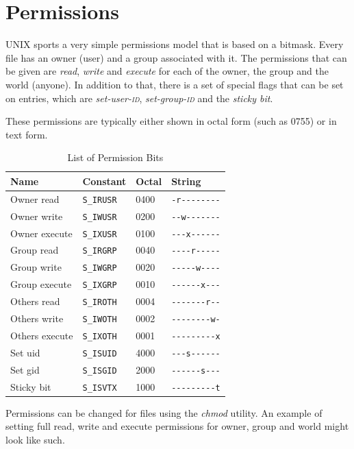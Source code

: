 \documentclass[a4paper]{article}
\begin{document}
\section{Permissions}\label{sec:permissions}

UNIX sports a very simple permissions model that is based on a bitmask. Every file has an owner (user) and a group associated with it. The permissions that can be given are \emph{read}, \emph{write} and \emph{execute} for each of the owner, the group and the world (anyone). In addition to that, there is a set of special flags that can be set on entries, which are \emph{set-user-\textsc{id}}, \emph{set-group-\textsc{id}} and the \emph{sticky bit}.

These permissions are typically either shown in octal form (such as 0755) or in text form.

\begin{table}[!h]
\centering\caption{List of Permission Bits}
\begin{tabular}{@{}llll@{}}
\toprule
Name & Constant & Octal & String\\
\midrule
Owner read    & \verb|S_IRUSR| & 0400 & \verb|-r--------|\\
Owner write   & \verb|S_IWUSR| & 0200 & \verb|--w-------|\\
Owner execute & \verb|S_IXUSR| & 0100 & \verb|---x------|\\
\midrule
Group read    & \verb|S_IRGRP| & 0040 & \verb|----r-----|\\
Group write   & \verb|S_IWGRP| & 0020 & \verb|-----w----|\\
Group execute & \verb|S_IXGRP| & 0010 & \verb|------x---|\\
\midrule
Others read   & \verb|S_IROTH| & 0004 & \verb|-------r--|\\
Others write  & \verb|S_IWOTH| & 0002 & \verb|--------w-|\\
Others execute& \verb|S_IXOTH| & 0001 & \verb|---------x|\\
\midrule
Set \gls{uid} & \verb|S_ISUID| & 4000 & \verb|---s------|\\
Set \gls{gid} & \verb|S_ISGID| & 2000 & \verb|------s---|\\
Sticky bit    & \verb|S_ISVTX| & 1000 & \verb|---------t|\\
\bottomrule  
\end{tabular}
\end{table}
Permissions can be changed for files using the \emph{chmod} utility. An example of setting full read, write and execute permissions for owner, group and world might look like such.
\end{document}
